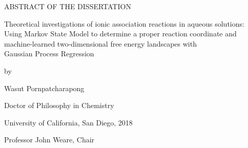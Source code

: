 \newpage

\begingroup
\vspace*{1.5in}
\begin{center}
    {ABSTRACT OF THE DISSERTATION}
\end{center}
\endgroup

\vspace{1.2cm}

\begin{center}
    \begin{spacing}{1.0}
    {Theoretical investigations of ionic association reactions in aqueous solutions: \\
    Using Markov State Model to determine a proper reaction coordinate and \\
    machine-learned two-dimensional free energy landscapes with \\
    Gaussian Process Regression}
    \end{spacing}

    \vspace{0.6cm}

    by

    \vspace{0.6cm}

    \begin{spacing}{1.0}
        Wasut Pornpatcharapong

        Doctor of Philosophy in Chemistry

        University of California, San Diego, 2018
    \end{spacing}

    \vspace{0.6cm}

    Professor John Weare, Chair
\end{center}

\vspace{0.6cm}

\begin{spacing}{2.0}
    \lipsum[1-3]
\end{spacing}
